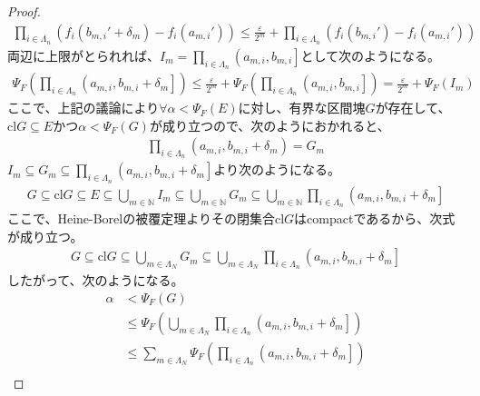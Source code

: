 \documentclass[dvipdfmx]{jsarticle}
\begin{document}
\begin{proof}
\begin{align*}
\prod_{i \in \varLambda_{n}} \left( f_{i}\left( b_{m,i}' + \delta_{m} \right) - f_{i}\left( a_{m,i}' \right) \right) \leq \frac{\varepsilon}{2^{m}} + \prod_{i \in \varLambda_{n}} \left( f_{i}\left( b_{m,i}' \right) - f_{i}\left( a_{m,i}' \right) \right)
\end{align*}
両辺に上限がとられれば、$I_{m} = \prod_{i \in \varLambda_{n}} \left( a_{m,i},b_{m,i} \right]$として次のようになる。
\begin{align*}
\varPsi_{F}\left( \prod_{i \in \varLambda_{n}} \left( a_{m,i},b_{m,i} + \delta_{m} \right] \right) \leq \frac{\varepsilon}{2^{m}} + \varPsi_{F}\left( \prod_{i \in \varLambda_{n}} \left( a_{m,i},b_{m,i} \right] \right) = \frac{\varepsilon}{2^{m}} + \varPsi_{F}\left( I_{m} \right)
\end{align*}
ここで、上記の議論により$\forall\alpha < \varPsi_{F}(E)$に対し、有界な区間塊$G$が存在して、$\mathrm{cl}G \subseteq E$かつ$\alpha < \varPsi_{F}(G)$が成り立つので、次のようにおかれると、
\begin{align*}
\prod_{i \in \varLambda_{n}} \left( a_{m,i},b_{m,i} + \delta_{m} \right) = G_{m}
\end{align*}
$I_{m} \subseteq G_{m} \subseteq \prod_{i \in \varLambda_{n}} \left( a_{m,i},b_{m,i} + \delta_{m} \right]$より次のようになる。
\begin{align*}
G \subseteq \mathrm{cl}G \subseteq E \subseteq \bigcup_{m \in \mathbb{N}} I_{m} \subseteq \bigcup_{m \in \mathbb{N}} G_{m} \subseteq \bigcup_{m \in \mathbb{N}} {\prod_{i \in \varLambda_{n}} \left( a_{m,i},b_{m,i} + \delta_{m} \right]}
\end{align*}
ここで、Heine-Borelの被覆定理よりその閉集合$\mathrm{cl}G$はcompactであるから、次式が成り立つ。
\begin{align*}
G \subseteq \mathrm{cl}G \subseteq \bigcup_{m \in \varLambda_{N}} G_{m} \subseteq \bigcup_{m \in \varLambda_{N}} {\prod_{i \in \varLambda_{n}} \left( a_{m,i},b_{m,i} + \delta_{m} \right]}
\end{align*}
したがって、次のようになる。
\begin{align*}
\alpha &< \varPsi_{F}(G)\\
&\leq \varPsi_{F}\left( \bigcup_{m \in \varLambda_{N}} {\prod_{i \in \varLambda_{n}} \left( a_{m,i},b_{m,i} + \delta_{m} \right]} \right)\\
&\leq \sum_{m \in \varLambda_{N}} {\varPsi_{F}\left( \prod_{i \in \varLambda_{n}} \left( a_{m,i},b_{m,i} + \delta_{m} \right] \right)}\\

\end{align*}
\end{proof}
\end{document}
